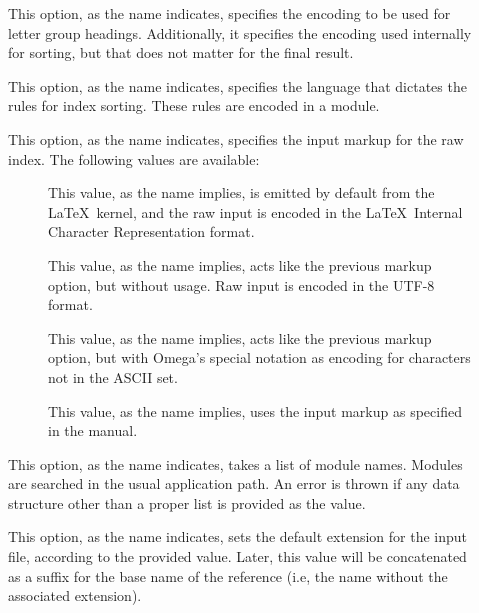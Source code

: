\begin{description}
\begin{description}
\item[] This option, as the name indicates, specifies the encoding to be used for letter group headings. Additionally, it specifies the encoding used internally for sorting, but that does not matter for the final result.

\item[] This option, as the name indicates, specifies the language that dictates the rules for index sorting. These rules are encoded in a module.

\item[] This option, as the name indicates, specifies the input markup for the raw index. The following values are available:

\begin{description}
\item[] This value, as the name implies, is emitted by default from the \LaTeX\ kernel, and the raw input is encoded in the \LaTeX\ Internal Character Representation format.

\item[] This value, as the name implies, acts like the previous  markup option, but without  usage. Raw input is encoded in the UTF-8 format.

\item[] This value, as the name implies, acts like the previous  markup option, but with Omega's special notation as encoding for characters not in the ASCII set.

\item[] This value, as the name implies, uses the  input markup as specified in the  manual.
\end{description}

\item[] This option, as the name indicates, takes a list of module names. Modules are searched in the usual application path. An error is thrown if any data structure other than a proper list is provided as the value.

\item[] This option, as the name indicates, sets the default extension for the input file, according to the provided value. Later, this value will be concatenated as a suffix for the base name of the  reference (i.e, the name without the associated extension).


\end{description}
\end{description}
